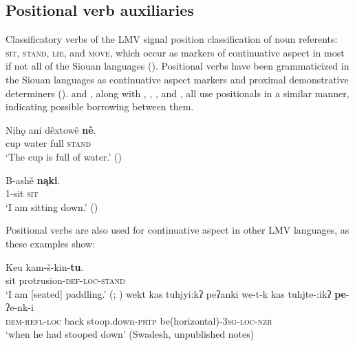 \documentclass[output=paper]{LSP/langsci}
\begin{document}
\subsection{Positional verb auxiliaries}

Classificatory verbs of the LMV signal position classification of noun referents: \textsc{sit}, \textsc{stand}, \textsc{lie}, and \textsc{move}, which occur as markers of continuative aspect in most if not all of the Siouan languages (\citealt[203]{Rankin2004positionals}). Positional verbs have been grammaticized in the Siouan languages as continuative aspect markers and proximal demonstrative determiners (\citealt[116]{Mithun1999}).  and , along with , , , and , all use positionals in a similar manner, indicating possible borrowing between them. 

\ea
\settowidth{}
\gll	Nihǫ 	ani 	dêxtowê \textbf{nê}.\\
		cup water full  \textsc{stand}\\ 
\glt	`The cup is full of water.' (\citealt[166]{DorseySwanton1912})
\z
		
\ea
\settowidth{}
\gll	B-ashě \textbf{nąki}.\\
		1-sit \textsc{sit}\\ 
\glt	`I am sitting down.' (\citealt[20]{Rankin2002})
\z

Positional verbs are also used for continuative aspect in other LMV languages, as these examples show:

\ea
\settowidth{}
\gll	Keu kam-š-kin-\textbf{tu}.\\
		sit protrusion-\textsc{def-loc-stand}\\ 
\glt `I am [seated] paddling.' (\citealt[61]{GatschetSwanton1932}; \citealt[27]{Watkins1976})\footnotemark
\z
{}
\ea	
\settowidth{}
wekt kas tuhjyi:kʔ peʔanki 
\gll		we-t-k 	 kas 	 tuhjte-:ikʔ 	 \textbf{pe}-ʔe-nk-i\\
		\textsc{dem-refl-loc} back	  stoop.down-\textsc{prtp} be(horizontal)-\textsc{3sg-loc-nzr}\\
\glt	`when he had stooped down' (Swadesh, unpublished notes)
\z
\end{document}
